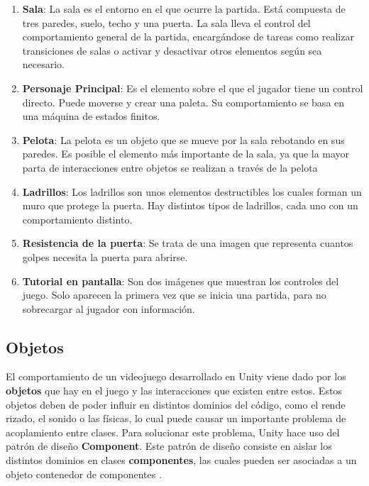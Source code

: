 \begin{enumerate}
\item\textbf{Sala}: La sala es el entorno en el que ocurre la partida. Está compuesta de tres paredes, suelo, techo y una puerta. La sala lleva el control del comportamiento general de la partida, encargándose de tareas como realizar transiciones de salas o activar y desactivar otros elementos según sea necesario.
\item\textbf{Personaje Principal}: Es el elemento sobre el que el jugador tiene un control directo. Puede moverse y crear una paleta. Su comportamiento se basa en una máquina de estados finitos.
\item\textbf{Pelota}: La pelota es un objeto que se mueve por la sala rebotando en sus paredes. Es posible el elemento más importante de la sala, ya que la mayor parta de interacciones entre objetos se realizan a través de la pelota
\item\textbf{Ladrillos}: Los ladrillos son unos elementos destructibles los cuales forman un muro que protege la puerta. Hay distintos tipos de ladrillos, cada uno con un comportamiento distinto.
\item\textbf{Resistencia de la puerta}: Se trata de una imagen que representa cuantos golpes necesita la puerta para abrirse.
\item\textbf{Tutorial en pantalla}: Son dos imágenes que muestran los controles del juego. Solo aparecen la primera vez que se inicia una partida, para no sobrecargar al jugador con información.
\end{enumerate}

\subsection{Objetos}
El comportamiento de un videojuego desarrollado en Unity viene dado por los \textbf{objetos} que hay en el juego y las interacciones que existen entre estos. Estos objetos deben de poder influir en distintos dominios del código, como el rende rizado, el sonido o las físicas, lo cual puede causar un importante problema de acoplamiento entre clases. Para solucionar este problema, Unity hace uso del patrón de diseño \textbf{Component}. Este patrón de diseño  
consiste en aislar los distintos dominios en clases \textbf{componentes}, las cuales pueden ser asociadas a un objeto contenedor de componentes \cite{game_programming_patterns}.

